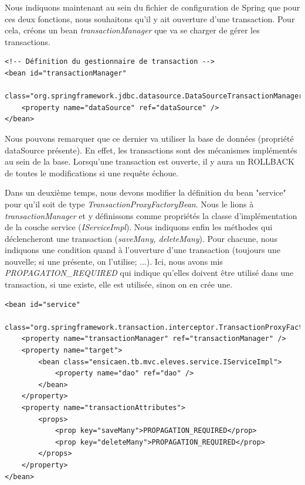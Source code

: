 \documentclass[a4paper,12pt]{article}
\begin{document}
Nous indiquons maintenant au sein du fichier de configuration de Spring que pour ces deux fonctions, nous souhaitons qu'il y ait ouverture d'une transaction.
Pour cela, créons un bean \textit{transactionManager} que va se charger de gérer les transactions.
\begin{lstlisting}
<!-- Définition du gestionnaire de transaction -->
<bean id="transactionManager"
	class="org.springframework.jdbc.datasource.DataSourceTransactionManager">
	<property name="dataSource" ref="dataSource" />
</bean>
\end{lstlisting}
Nous pouvons remarquer que ce dernier va utiliser la base de données (propriété dataSource présente). En effet, les transactions sont des mécanismes
implémentés au sein de la base. Lorsqu'une transaction est ouverte, il y aura un ROLLBACK de toutes le modifications si une requête échoue.

Dans un deuxième temps, nous devons modifier la définition du bean "service" pour qu'il soit de type \textit{TransactionProxyFactoryBean}. 
Nous le lions à \textit{transactionManager} et y définissons comme propriétés la classe d'implémentation de la couche service (\textit{IServiceImpl}). 
Nous indiquons enfin les méthodes qui déclencheront une transaction (\textit{saveMany, deleteMany}). Pour chacune, nous indiquons une 
condition quand à l'ouverture d'une transaction (toujours une nouvelle; si une présente, on l'utilise; ...). Ici, nous avons mis \textit{PROPAGATION\_REQUIRED}
qui indique qu'elles doivent être utilisé dans une transaction, si une existe, elle est utilisée, sinon on en crée une.
\begin{lstlisting}
<bean id="service"
	class="org.springframework.transaction.interceptor.TransactionProxyFactoryBean">
	<property name="transactionManager" ref="transactionManager" />
	<property name="target">
		<bean class="ensicaen.tb.mvc.eleves.service.IServiceImpl">
			<property name="dao" ref="dao" />
		</bean>
	</property>
	<property name="transactionAttributes">
		<props>
			<prop key="saveMany">PROPAGATION_REQUIRED</prop>
			<prop key="deleteMany">PROPAGATION_REQUIRED</prop>
		</props>
	</property>
</bean>
\end{lstlisting}
\end{document}
